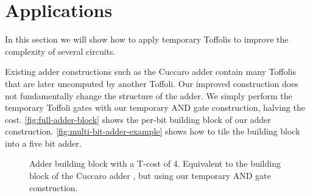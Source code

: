 \documentclass[twocolumn,longbibliography]{quantumarticle-customized}
\begin{document}
\section{Applications}
\label{sec:circuit-constructions}

In this section we will show how to apply temporary Toffolis to improve the complexity of several circuits.

Existing adder constructions such as the Cuccaro adder \cite{Cuccaro2004} contain many Toffolis that are later uncomputed by another Toffoli.
Our improved construction does not fundamentally change the structure of the adder.
We simply perform the temporary Toffoli gates with our temporary AND gate construction, halving the cost.
\autoref{fig:full-adder-block} shows the per-bit building block of our adder construction.
\autoref{fig:multi-bit-adder-example} shows how to tile the building block into a five bit adder.

\begin{figure}
  \caption{
	Adder building block with a T-cost of 4.
	Equivalent to the building block of the Cuccaro adder \cite{Cuccaro2004}, but using our temporary AND gate construction.
  }
  \label{fig:full-adder-block}
\end{figure}
\end{document}
